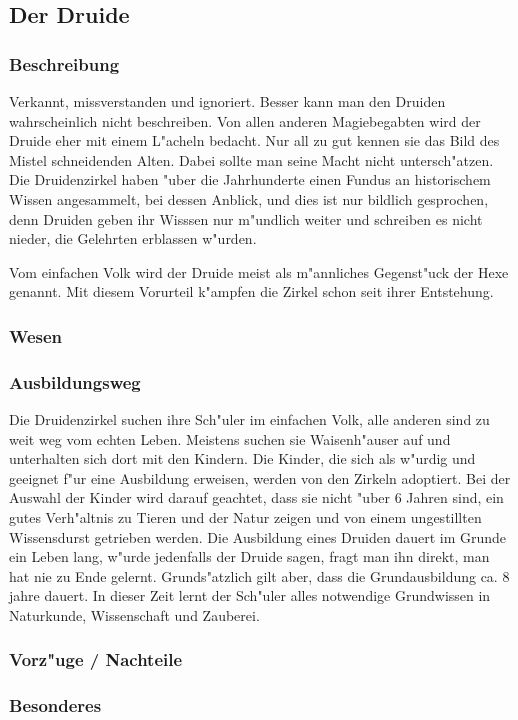 \subsection{Der Druide}
\subsubsection{Beschreibung}
\par Verkannt, missverstanden und ignoriert. Besser kann man den Druiden wahrscheinlich nicht beschreiben.
Von allen anderen Magiebegabten wird der Druide eher mit einem L"acheln bedacht. Nur all zu gut kennen sie 
das Bild des Mistel schneidenden Alten. Dabei sollte man seine Macht nicht untersch"atzen. Die Druidenzirkel 
haben "uber die Jahrhunderte einen Fundus an historischem Wissen angesammelt, bei dessen Anblick, und dies ist 
nur bildlich gesprochen, denn Druiden geben ihr Wisssen nur m"undlich weiter und schreiben es nicht nieder, 
die Gelehrten erblassen w"urden.
\par Vom einfachen Volk wird der Druide meist als m"annliches Gegenst"uck der Hexe genannt. Mit diesem 
Vorurteil k"ampfen die Zirkel schon seit ihrer Entstehung.
\subsubsection{Wesen}
\subsubsection{Ausbildungsweg}
\par Die Druidenzirkel suchen ihre Sch"uler im einfachen Volk, alle anderen sind zu weit weg vom echten Leben.
 Meistens suchen sie Waisenh"auser auf und unterhalten sich dort mit den Kindern. Die Kinder, die sich als
  w"urdig und geeignet f"ur eine Ausbildung erweisen, werden von den Zirkeln adoptiert. Bei der Auswahl der
   Kinder wird darauf geachtet, dass sie nicht "uber 6 Jahren sind, ein gutes Verh"altnis zu Tieren und der 
   Natur zeigen und von einem ungestillten Wissensdurst getrieben werden. Die Ausbildung eines Druiden dauert 
   im Grunde ein Leben lang, w"urde jedenfalls der Druide sagen, fragt man ihn direkt, man hat nie zu Ende 
   gelernt. Grunds"atzlich gilt aber, dass die Grundausbildung ca. 8 jahre dauert. In dieser Zeit lernt der 
   Sch"uler alles notwendige Grundwissen in Naturkunde, Wissenschaft und Zauberei.
\subsubsection{Vorz"uge / Nachteile}
\subsubsection{Besonderes}
